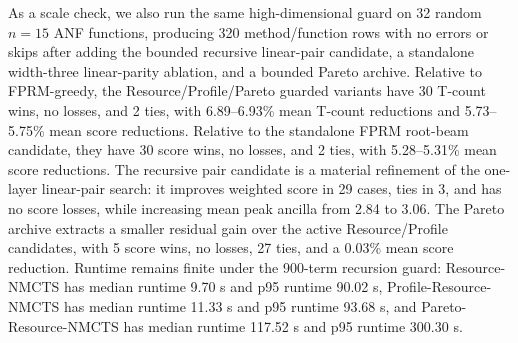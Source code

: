 \documentclass[11pt]{article}
\newcommand{\method}{Resource-NMCTS}
\newcommand{\profilemethod}{Profile-Resource-NMCTS}
\newcommand{\paretomethod}{Pareto-Resource-NMCTS}
\newcommand{\scaledataset}{highdim\_scale\_resource}
\begin{document}
As a scale check, we also run the same high-dimensional guard on 32 random
$n=15$ ANF functions, producing 320 method/function rows with no errors or
skips after adding the bounded recursive linear-pair candidate, a standalone
width-three linear-parity ablation, and a bounded Pareto archive.  Relative to
FPRM-greedy, the Resource/Profile/Pareto guarded variants have 30 T-count
wins, no losses, and 2 ties, with 6.89--6.93\% mean T-count reductions and
5.73--5.75\% mean score reductions.  Relative to the standalone FPRM
root-beam candidate, they have 30 score wins, no losses, and 2 ties, with
5.28--5.31\% mean score reductions.  The recursive pair candidate is a
material refinement of the one-layer linear-pair search: it improves weighted
score in 29 cases, ties in 3, and has no score losses, while increasing mean
peak ancilla from 2.84 to 3.06.  The Pareto archive extracts a smaller
residual gain over the active Resource/Profile candidates, with 5 score wins,
no losses, 27 ties, and a 0.03\% mean score reduction.  Runtime remains finite
under the 900-term recursion guard: \method{} has median runtime 9.70 s and
p95 runtime 90.02 s, \profilemethod{} has median runtime 11.33 s and p95
runtime 93.68 s, and \paretomethod{} has median runtime 117.52 s and p95
runtime 300.30 s.

\begin{table}[t]
\centering
\small
\caption{Mean logical resources on the \scaledataset{} $n=15$ scaling check.}
\label{tab:scale-resources}

\end{table}

\begin{table}[t]
\centering
\small
\caption{Runtime distribution on the \scaledataset{} $n=15$ scaling check.}
\label{tab:scale-runtime}

\end{table}
\end{document}

